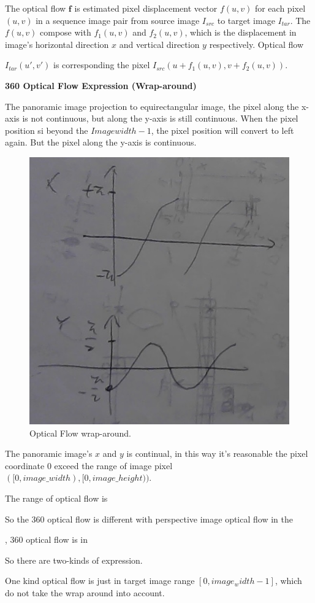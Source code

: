 The optical flow $\textbf{f}$ is estimated pixel displacement vector $f(u,v)$ for each pixel $(u,v)$ in a sequence image pair from source image $I_{src}$ to target image $I_{tar}$.
The $f(u,v)$ compose with $f_1(u,v)$ and $f_2(u,v)$, which is the displacement in image's horizontal direction $x$ and vertical direction $y$ respectively.
Optical flow 

$I_{tar}(u',v')$ is corresponding the pixel $I_{src}(u + f_1(u,v), v + f_2(u,v))$.

\textbf{360 Optical Flow Expression (Wrap-around)}

The panoramic image projection to equirectangular image, the pixel along the x-axis is not continuous, but along the y-axis is still continuous. When the pixel position si beyond the  ${Imagewidth -1}$, the pixel position will convert to left again.
But the pixel along the y-axis is continuous.

\begin{figure}[hbt!]
	\centering
	\includegraphics[width=0.45\linewidth]{images/wrap-around-0.jpg}
	\caption{Optical Flow wrap-around.}
	\label{fig:app:warparound}
\end{figure}

The panoramic image's $x$ and $y$ is continual, in this way it's reasonable the pixel coordinate 0 exceed the range of image pixel $([0, image\_width), [0, image\_height))$. 

The range of optical flow is 

So the 360 optical flow is different with perspective image optical flow in the 

, 360 optical flow is  in 

So there are two-kinds of expression.

One kind optical flow is just in target image range $[0, image_width - 1]$, which do not take the wrap around into account.

